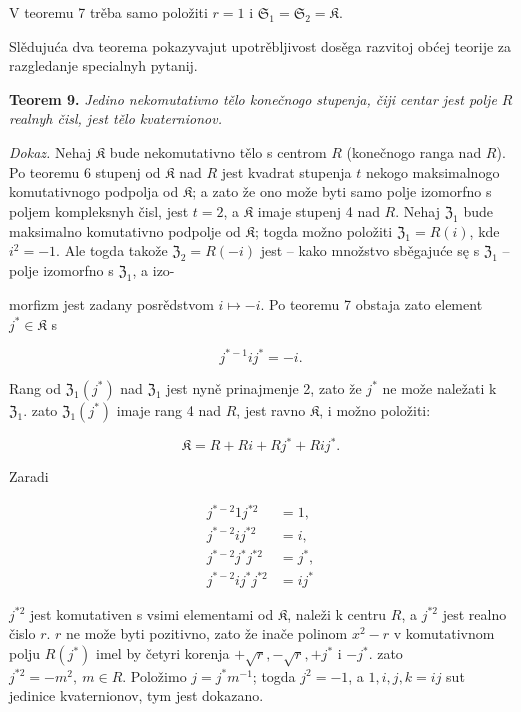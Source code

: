 \documentclass[11pt]{article}
\begin{document}
V teoremu 7 trěba samo položiti \(r=1\) i \(\mathfrak S_1=\mathfrak S_2=\mathfrak K\).

Slědujuća dva teorema pokazyvajut upotrěbljivost dosěga razvitoj obćej teorije za razgledanje specialnyh pytanij.

\textbf{Teorem 9.} \emph{Jedino nekomutativno tělo konečnogo stupenja, čiji centar jest polje \(R\) realnyh čisl, jest tělo kvaternionov.}

\emph{Dokaz.} Nehaj \(\mathfrak K\) bude nekomutativno tělo s centrom \(R\) (konečnogo ranga nad \(R\)). Po teoremu 6 stupenj od \(\mathfrak K\) nad \(R\) jest kvadrat stupenja \(t\) nekogo maksimalnogo komutativnogo podpolja od \(\mathfrak K\); a zato že ono može byti samo polje izomorfno s poljem kompleksnyh čisl, jest \(t=2\), a \(\mathfrak K\) imaje stupenj 4 nad \(R\). Nehaj \(\mathfrak Z_1\) bude maksimalno komutativno podpolje od \(\mathfrak K\); togda možno položiti \(\mathfrak Z_1=R(i)\), kde \(i^2=-1\). Ale togda takože \(\mathfrak Z_2=R(-i)\) jest -- kako množstvo sběgajuće sę s \(\mathfrak Z_1\) -- polje izomorfno s \(\mathfrak Z_1\), a izo-

morfizm jest zadany posrědstvom \(i\mapsto -i\). Po teoremu 7 obstaja zato element \(j^*\in\mathfrak K\) s

\[
j^{*-1}ij^*=-i.
\]

Rang od \(\mathfrak Z_1(j^*)\) nad \(\mathfrak Z_1\) jest nyně prinajmenje 2, zato že \(j^*\) ne može naležati k \(\mathfrak Z_1\). zato \(\mathfrak Z_1(j^*)\) imaje rang 4 nad \(R\), jest ravno \(\mathfrak K\), i možno položiti:

\[
\mathfrak K=R+Ri+Rj^*+Rij^*.
\]

Zaradi

\[
\begin{aligned}
j^{*-2}1j^{*2}&=1,\\
j^{*-2}ij^{*2}&=i,\\
j^{*-2}j^*j^{*2}&=j^*,\\
j^{*-2}ij^*j^{*2}&=ij^*
\end{aligned}
\]

\(j^{*2}\) jest komutativen s vsimi elementami od \(\mathfrak K\), naleži k centru \(R\), a \(j^{*2}\) jest realno čislo \(r\). \(r\) ne može byti pozitivno, zato že inače polinom \(x^2-r\) v komutativnom polju \(R(j^*)\) imel by četyri korenja \(+\sqrt r,-\sqrt r,+j^*\) i \(-j^*\). zato \(j^{*2}=-m^2,\ m\in R\). Položimo \(j=j^*m^{-1}\); togda \(j^2=-1\), a \(1,i,j,k=ij\) sut jedinice kvaternionov, tym jest dokazano.
\end{document}
